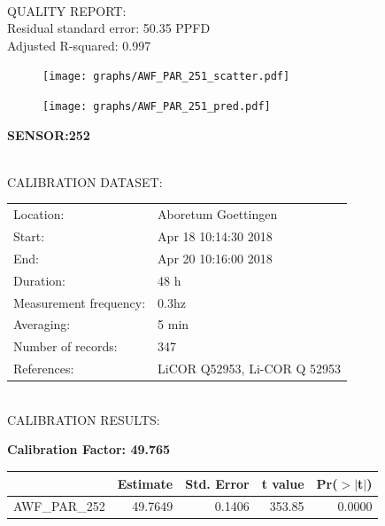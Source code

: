 \documentclass[oneside]{report}
\begin{document}
\hrulefill\\
QUALITY REPORT:\\
Residual standard error: 50.35 PPFD\\
Adjusted R-squared: 0.997



\begin{figure}[H]
  \centering
  \texttt{[image: graphs/AWF\_PAR\_251\_scatter.pdf]}
\end{figure}




\begin{figure}[H]
  \centering
  \texttt{[image: graphs/AWF\_PAR\_251\_pred.pdf]}
\end{figure}

\pagebreak


\begin{center}
\large{\textbf{SENSOR:252}}\\
\end{center}

\hrulefill\\
CALIBRATION DATASET:\\
\begin{table}[h!]
  \centering
  \label{tab:table1}
  \begin{tabular}{ll}
    Location: & Aboretum Goettingen\\ 
    
    
    Start:  & Apr 18 10:14:30 2018 \\
    End:   & Apr 20 10:16:00 2018\\ 
    Duration: & 48 h\\
    Measurement frequency: & 0.3hz\\
    Averaging:  &5 min\\
    Number of records: & 347 \\
    References: & LiCOR Q52953, Li-COR Q 52953 \\
  \end{tabular}
\end{table}

\hrulefill\\
CALIBRATION RESULTS:\\


\begin{center}
\textbf{\large{Calibration Factor: 49.765}}\\
\end{center}
\begin{table}[ht]
\centering
\begin{tabular}{rrrrr}
  \hline
 & Estimate & Std. Error & t value & Pr($>$$|$t$|$) \\ 
  \hline
AWF\_PAR\_252 & 49.7649 & 0.1406 & 353.85 & 0.0000 \\ 
   \hline
\end{tabular}
\end{table}
\end{document}
